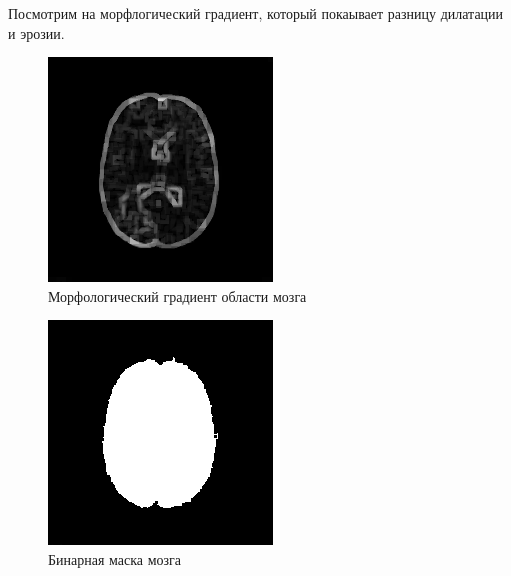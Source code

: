 Посмотрим на морфлогический градиент, который покаывает разницу дилатации и эрозии.

\begin{figure}[H]
    \includegraphics[width=\textwidth]{../outputs/1_gradient.png}
    \caption{Морфологический градиент области мозга}
\end{figure}

\begin{figure}[H]
    \includegraphics[width=\textwidth]{../outputs/1_mask.png}
    \caption{Бинарная маска мозга}
\end{figure}

